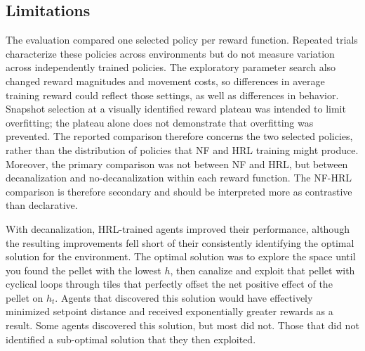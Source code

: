 \documentclass[12pt,fleqn]{article}
\begin{document}
\subsection{Limitations}

The evaluation compared one selected policy per reward function. Repeated trials characterize these policies across environments but do not measure variation across independently trained policies. The exploratory parameter search also changed reward magnitudes and movement costs, so differences in average training reward could reflect those settings, as well as differences in behavior. Snapshot selection at a visually identified reward plateau was intended to limit overfitting; the plateau alone does not demonstrate that overfitting was prevented. The reported comparison therefore concerns the two selected policies, rather than the distribution of policies that NF and HRL training might produce. Moreover, the primary comparison was not between NF and HRL, but between decanalization and no-decanalization within each reward function. The NF-HRL comparison is therefore secondary and should be interpreted more as contrastive than declarative.

With decanalization, HRL-trained agents improved their performance, although the resulting improvements fell short of their consistently identifying the optimal solution for the environment. The optimal solution was to explore the space until you found the pellet with the lowest \(h\), then canalize and exploit that pellet with cyclical loops through tiles that perfectly offset the net positive effect of the pellet on \(h_t\). Agents that discovered this solution would have effectively minimized setpoint distance and received exponentially greater rewards as a result. Some agents discovered this solution, but most did not. Those that did not identified a sub-optimal solution that they then exploited.
\end{document}
